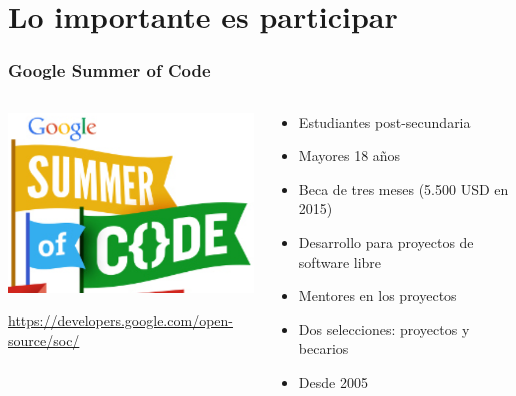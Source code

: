 %
%

\section{Lo importante es participar}

\begin{frame}
\frametitle{Google Summer of Code}

\begin{columns}[T]
\begin{column}{.38\textwidth}
\includegraphics[width=6.5cm]{figs/gsoc-logo}

\begin{flushright}
{\small
\url{https://developers.google.com/open-source/soc/}
}
\end{flushright}

\end{column}%
\hfill%
\begin{column}{.60\textwidth}
{\Large
\begin{itemize}
\item Estudiantes post-secundaria
\item Mayores 18 años
\item Beca de tres meses (5.500 USD en 2015) 
\item Desarrollo para proyectos de software libre
\item Mentores en los proyectos
\item Dos selecciones: proyectos y becarios
\item Desde 2005
\end{itemize}
}
\end{column}%
\end{columns}

\end{frame}


